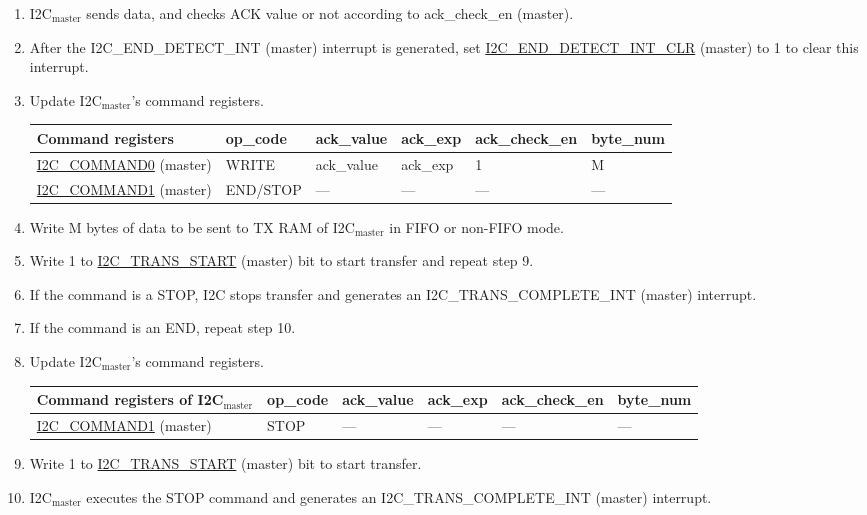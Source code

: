 \documentclass[main\_\_EN.tex]{subfiles}
\begin{document}
\begin{enumerate}
\item I2C$_\text{master}$ sends data, and checks ACK value or not according to ack\_check\_en (master).

\item After the I2C\_END\_DETECT\_INT (master) interrupt is generated, set \hyperref[fielddesc:I2CENDDETECTINTCLR]{I2C\_END\_DETECT\_INT\_CLR} (master) to 1 to clear this interrupt.
\item Update I2C$_\text{master}$'s command registers.
\begin{longtable}{ | p{4cm} | p{2cm} | p{2cm} | p{2cm} |p{2cm} | p{2cm} |}
\hline\rowcolor{lightgray}
Command registers& op\_code & ack\_value&ack\_exp&ack\_check\_en&byte\_num  \\ \hline
\hyperref[fielddesc:I2CCOMMAND0]{I2C\_COMMAND0} (master)& WRITE& ack\_value&ack\_exp&1&M  \\ \hline
\hyperref[fielddesc:I2CCOMMAND1]{I2C\_COMMAND1} (master)& END/STOP& ---&---&---&---  \\ \hline
\end{longtable} 
\item Write M bytes of data to be sent to TX RAM of I2C$_\text{master}$ in FIFO or non-FIFO mode.
\item Write 1 to \hyperref[fielddesc:I2CTRANSSTART]{I2C\_TRANS\_START} (master) bit to start transfer and repeat step 9.
\item If the command is a STOP, I2C stops transfer and generates an I2C\_TRANS\_COMPLETE\_INT (master) interrupt.
\item If the command is an END, repeat step 10.
\item Update I2C$_\text{master}$'s command registers.
\begin{longtable}{ | p{4cm} | p{2cm} | p{2cm} | p{2cm} |p{2cm} | p{2cm} |}
\hline\rowcolor{lightgray}
Command registers of I2C$_\text{master}$& op\_code & ack\_value&ack\_exp&ack\_check\_en&byte\_num  \\ \hline
\hyperref[fielddesc:I2CCOMMAND1]{I2C\_COMMAND1} (master)& STOP& ---&---&---&---  \\ \hline
\end{longtable} 
\item Write 1 to \hyperref[fielddesc:I2CTRANSSTART]{I2C\_TRANS\_START} (master) bit to start transfer.
\item I2C$_\text{master}$ executes the STOP command and generates an I2C\_TRANS\_COMPLETE\_INT (master) interrupt.

\end{enumerate}
\end{document}
